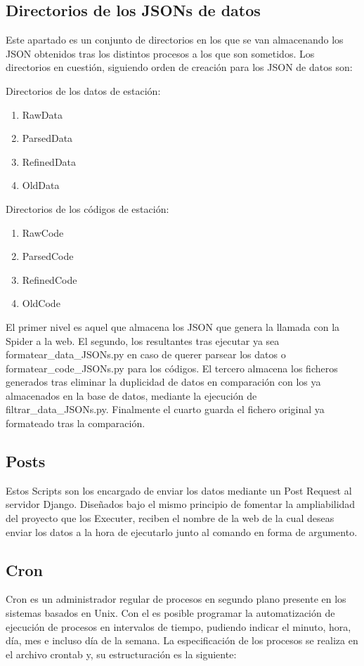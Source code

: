 \subsection{Directorios de los JSONs de datos}
Este apartado es un conjunto de directorios en los que se van almacenando los JSON obtenidos tras los distintos procesos a los que son sometidos. Los directorios en cuestión, siguiendo orden de creación para los JSON de datos son:

\begin{multicols}{2}
Directorios de los datos de estación:
\begin{enumerate}
	\item RawData
	\item ParsedData
	\item RefinedData
	\item OldData
\end{enumerate}

\columnbreak

Directorios de los códigos de estación:
\begin{enumerate}
	\item RawCode
	\item ParsedCode
	\item RefinedCode
	\item OldCode
\end{enumerate}
\end{multicols}

El primer nivel es aquel que almacena los JSON que genera la llamada con la Spider a la web. El segundo, los resultantes tras ejecutar ya sea formatear\_data\_JSONs.py en caso de querer parsear los datos o formatear\_code\_JSONs.py para los códigos. El tercero almacena los ficheros generados tras eliminar la duplicidad de datos en comparación con los ya almacenados en la base de datos, mediante la ejecución de filtrar\_data\_JSONs.py. Finalmente el cuarto guarda el fichero original ya formateado tras la comparación.

\subsection{Posts}
Estos Scripts son los encargado de enviar los datos mediante un Post Request al servidor Django. Diseñados bajo el mismo principio de fomentar la ampliabilidad del proyecto que los Executer, reciben el nombre de la web de la cual deseas enviar los datos a la hora de ejecutarlo junto al comando en forma de argumento.

\subsection{Cron}
Cron es un administrador regular de procesos en segundo plano presente en los sistemas basados en Unix. Con el es posible programar la automatización de ejecución de procesos en intervalos de tiempo, pudiendo indicar el minuto, hora, día, mes e incluso día de la semana.\newline
\newline
La especificación de los procesos se realiza en el archivo crontab y, su estructuración es la siguiente:

